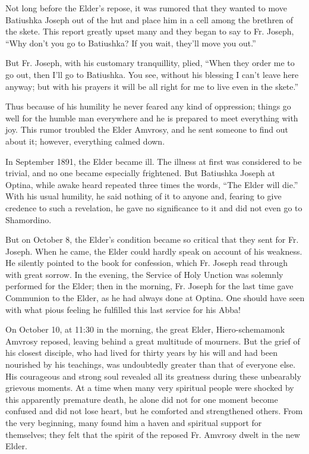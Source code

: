 Not long before the Elder's repose, it was rumored that they wanted to move Batiushka Joseph out of the hut and place him in a cell among the brethren of the skete. This report greatly upset many and they began to say to Fr. Joseph, ``Why don't you go to Batiushka? If you wait, they'll move you out.''

But Fr. Joseph, with his customary tranquillity, plied, ``When they order me to go out, then I'll go to Batiushka. You see, without his blessing I can't leave here anyway; but with his prayers it will be all right for me to live even in the skete.''

Thus because of his humility he never feared any kind of oppression; things go well for the humble man everywhere and he is prepared to meet everything with joy. This rumor troubled the Elder Amvrosy, and he sent someone to find out about it; however, everything calmed down.

In September 1891, the Elder became ill. The illness at first was considered to be trivial, and no one became especially frightened. But Batiushka Joseph at Optina, while awake heard repeated three times the words, ``The Elder will die.'' With his usual humility, he said nothing of it to anyone and, fearing to give credence to such a revelation, he gave no significance to it and did not even go to Shamordino.

But on October 8, the Elder's condition became so critical that they sent for Fr. Joseph. When he came, the Elder could hardly speak on account of his weakness. He silently pointed to the book for confession, which Fr. Joseph read through with great sorrow. In the evening, the Service of Holy Unction was solemnly performed for the Elder; then in the morning, Fr. Joseph for the last time gave Communion to the Elder, as he had always done at Optina. One should have seen with what pious feeling he fulfilled this last service for his Abba!

On October 10, at 11:30 in the morning, the great Elder, Hiero-schemamonk Amvrosy reposed, leaving behind a great multitude of mourners. But the grief of his closest disciple, who had lived for thirty years by his will and had been nourished by his teachings, was undoubtedly greater than that of everyone else. His courageous and strong soul revealed all its greatness during these unbearably grievous moments. At a time when many very spiritual people were shocked by this apparently premature death, he alone did not for one moment become confused and did not lose heart, but he comforted and strengthened others. From the very beginning, many found him a haven and spiritual support for themselves; they felt that the spirit of the reposed Fr. Amvrosy dwelt in the new Elder.

